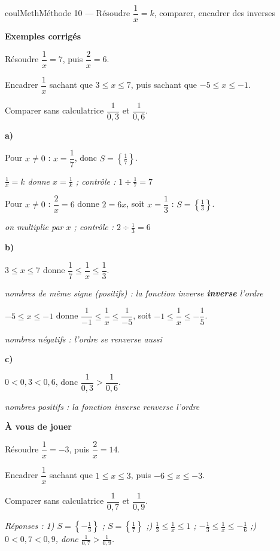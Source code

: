 \documentclass[11pt,a4paper]{article}
\makeatletter
\renewcommand{\le}{\leqslant}
\newcommand{\lycee@ens}[1]{\left\{#1\right\}}
\providecommand{\ens}{\lycee@ens}}
\newcounter{lycee@signet}
\newcommand{\signet}[3][]{\stepcounter{lycee@signet}%
  \edef\lycee@dest{\if\relax\detokenize{#1}\relax
    signet.\arabic{lycee@signet}\else#1\fi}%
  \hypertarget{\lycee@dest}{}\bookmark[level=#2,dest=\lycee@dest]{#3}}
\newcommand{\res}[1]{#1}
\newcounter{methode}
\newenvironment{methodebox}[1][Méthode]{\stepcounter{methode}%
  \begin{boitecours}[phantom={\signet[methode-\arabic{methode}]{2}{#1}}]{coulMeth}{#1}}%
  {\end{boitecours}}
\newcommand{\etape}[1]{\par\smallskip\textbf{\color{coulMeth}#1}\par\nobreak\smallskip}
\newcommand{\reponse}[1]{\par\smallskip
  {\footnotesize\itshape\color{black!55}Réponses : #1}}
\newcommand{\explique}[2]{\par\smallskip\noindent
  \begin{minipage}[t]{0.57\linewidth}\raggedright #1\end{minipage}\hfill
  \begin{minipage}[t]{0.40\linewidth}\raggedright\leavevmode
    {\small\itshape\color{black!60}#2}\end{minipage}\par}
\newcommand{\cas}[1]{\par\smallskip\noindent\textbf{\color{coulExo}#1}\vadjust{\nobreak}}
\newenvironment{correction}{\par}{\par}
\newcommand{\etapeexemples}{\etape{Exemples corrigés}}
\makeatother
\begin{document}
\begin{methodebox}[Méthode 10 --- Résoudre $\dfrac{1}{x}=k$, comparer, encadrer des inverses]
\etapeexemples
\begin{questions}[label=\alph*)]
  \item Résoudre $\dfrac{1}{x}=7$, puis $\dfrac{2}{x}=6$.
  \item Encadrer $\dfrac{1}{x}$ sachant que $3\le x\le 7$, puis sachant que
        $-5\le x\le -1$.
  \item Comparer sans calculatrice $\dfrac{1}{0{,}3}$ et $\dfrac{1}{0{,}6}$.
\end{questions}
\begin{correction}
\cas{a)}
\explique{Pour $x\ne 0$ : $x=\dfrac{1}{7}$, donc $S=\res{\ens{\frac{1}{7}}}$.}{$\frac{1}{x}=k$
donne $x=\frac{1}{k}$ ; contrôle : $1\div\frac{1}{7}=7$}
\explique{Pour $x\ne 0$ : $\dfrac{2}{x}=6$ donne $2=6x$, soit $x=\dfrac{1}{3}$ :
$S=\res{\ens{\frac{1}{3}}}$.}{on multiplie par $x$ ; contrôle : $2\div\frac{1}{3}=6$}
\cas{b)}
\explique{$3\le x\le 7$ donne $\res{\dfrac{1}{7}\le\dfrac{1}{x}\le\dfrac{1}{3}}$.}{nombres de
même signe (positifs) : la fonction inverse \textbf{inverse} l'ordre}
\explique{$-5\le x\le -1$ donne $\dfrac{1}{-1}\le\dfrac{1}{x}\le\dfrac{1}{-5}$, soit
$\res{-1\le\dfrac{1}{x}\le-\dfrac{1}{5}}$.}{nombres négatifs : l'ordre se renverse aussi}
\cas{c)}
\explique{$0<0{,}3<0{,}6$, donc $\res{\dfrac{1}{0{,}3}>\dfrac{1}{0{,}6}}$.}{nombres positifs : la
fonction inverse renverse l'ordre}
\end{correction}

\etape{À vous de jouer}
\begin{questions}
  \item Résoudre $\dfrac{1}{x}=-3$, puis $\dfrac{2}{x}=14$.
  \item Encadrer $\dfrac{1}{x}$ sachant que $1\le x\le 3$, puis $-6\le x\le -3$.
  \item Comparer sans calculatrice $\dfrac{1}{0{,}7}$ et $\dfrac{1}{0{,}9}$.
\end{questions}
\reponse{1\textdegree) $S=\ens{-\frac{1}{3}}$ ;\; $S=\ens{\frac{1}{7}}$ ;\; 2\textdegree)
$\frac{1}{3}\le\frac{1}{x}\le 1$ ;\; $-\frac{1}{3}\le\frac{1}{x}\le-\frac{1}{6}$ ;\;
3\textdegree) $0<0{,}7<0{,}9$, donc $\frac{1}{0{,}7}>\frac{1}{0{,}9}$.}
\end{methodebox}
\end{document}
